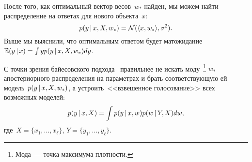 \documentclass[12pt,fleqn]{article}
\begin{document}
После того, как оптимальный вектор весов~$w_*$ найден,
мы можем найти распределение на ответах для нового объекта~$x$:
\[
    p(y \mspace{3mu}{|}\mspace{3mu} x, X, w_*)
    =
    \mathcal{N} (\langle x, w_* \rangle, \sigma^2).
\]
Выше мы выяснили, что оптимальным ответом будет
матожидание~$\mathbb{E} (y \mspace{3mu}{|}\mspace{3mu} x) = \int y p(y \mspace{3mu}{|}\mspace{3mu} x, X, w_*) dy$.

С точки зрения байесовского подхода~\cite{murphy12probabilistic}
правильнее не искать моду~\footnote{
    Мода~--- точка максимума плотности.
} $w_*$ апостериорного распределения на параметрах и брать соответствующую
ей модель~$p(y \mspace{3mu}{|}\mspace{3mu} x, X, w_*)$,
а устроить~<<взвешенное голосование>> всех возможных моделей:
\[
    p(y \mspace{3mu}{|}\mspace{3mu} x, X)
    =
    \int p(y \mspace{3mu}{|}\mspace{3mu} x, w) p(w \mspace{3mu}{|}\mspace{3mu} Y, X) dw,
\]
где~$X = \{x_1, \dots, x_\ell\}$, $Y = \{y_1, \dots, y_\ell\}$.



\end{document}
